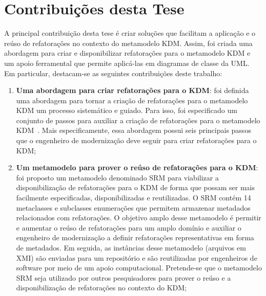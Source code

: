 \section{Contribuições desta Tese}\label{sec:contribuicoes_desta_tese}

A principal contribuição desta tese é criar soluções que facilitam a aplicação e o reúso de refatorações no contexto do metamodelo KDM. Assim, foi criada uma abordagem para criar e disponibilizar refatorações para o metamodelo KDM e um apoio ferramental que permite aplicá-las em diagramas de classe da UML. %
%
Em particular, destacam-se as seguintes contribuições deste trabalho:

\begin{enumerate}

\item \textbf{Uma abordagem para criar refatorações para o KDM}: foi definida uma abordagem para tornar a criação de refatorações para o metamodelo KDM um processo sistemático e guiado. Para isso, foi especificado um conjunto de passos para auxiliar a criação de refatorações para o metamodelo KDM~\cite{durelli_catalogo}. Mais especificamente, essa abordagem possui seis principais passos que o engenheiro de modernização deve seguir para criar refatorações para o KDM;

\item \textbf{Um metamodelo para prover o reúso de refatorações para o KDM}: foi proposto um metamodelo denominado SRM para viabilizar a disponibilização de refatorações para o KDM de forma que possam ser mais facilmente especificadas, disponibilizadas e reutilizadas. O SRM contém 14 metaclasses e subclasses enumerações que permitem armazenar metadados relacionados com refatorações. O objetivo amplo desse metamodelo é permitir e aumentar o reúso de refatorações para um amplo domínio e auxiliar o engenheiro de modernização a definir refatorações representativas em forma de metadados. Em seguida, as instâncias desse metamodelo (arquivos em XMI) são enviadas para um repositório e são reutilizadas por engenheiros de software por meio de um apoio computacional. Pretende-se que o metamodelo SRM seja utilizado por outros pesquisadores para prover o reúso e a disponibilização de refatorações no contexto do KDM;



\end{enumerate}
